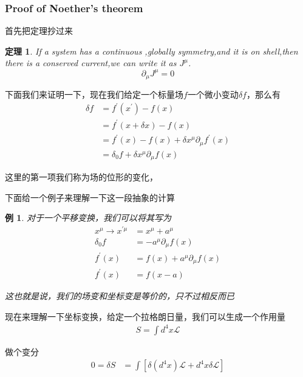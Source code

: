 \documentclass{article}
\newtheorem{theorem}{定理}
\newtheorem{example}{例}
\begin{document}
\subsubsection{Proof of Noether's theorem}

首先把定理抄过来
\begin{theorem}
    If a system has a continuous ,globally symmetry,and it is on shell,then there is a  conserved current,we can write it as $J^\mu$.
    \begin{equation*}
        \partial_\mu J^\mu=0
    \end{equation*}
\end{theorem}

下面我们来证明一下，现在我们给定一个标量场$f$一个微小变动$\delta f$，那么有
\begin{align*}
    \delta f&=f^\prime(x^\prime)-f(x)\\
    &=f^\prime(x+\delta x)-f(x)\\
    &=f^\prime(x)-f(x)+\delta x^\mu\partial_\mu f^\prime(x)\\
    &=\delta_0 f+\delta x^\mu\partial_\mu f(x)
\end{align*}

这里的第一项我们称为场的位形的变化，

下面给一个例子来理解一下这一段抽象的计算
\begin{example}
    对于一个平移变换，我们可以将其写为
    \begin{align*}
        x^\mu\to x^{\prime\mu}&=x^\mu+a^\mu\\
        \delta_0 f&=-a^\mu\partial_\mu f(x)\\
        f^\prime(x)&=f(x)+a^\mu\partial_\mu f(x)\\
        f^\prime(x)&=f(x-a)
    \end{align*}

    这也就是说，我们的场变和坐标变是等价的，只不过相反而已
\end{example}

现在来理解一下坐标变换，给定一个拉格朗日量，我们可以生成一个作用量
\begin{align*}
    S=\int d^4x\mathcal{L}
\end{align*}

做个变分
\begin{align*}
    0=\delta S&=\int \left[\delta\left(
    d^4x\right)\mathcal{L}+d^4x\delta\mathcal{L}\right]
\end{align*}
\end{document}
